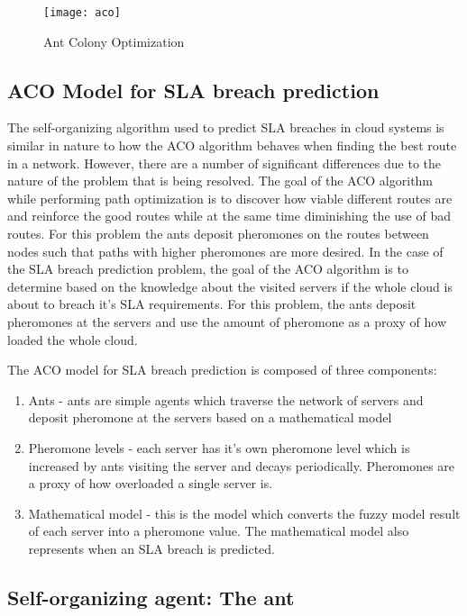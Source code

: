 \begin{figure}
	\centering
	\texttt{[image: aco]}
	\caption{Ant Colony Optimization}
	\label{fig:aco}
\end{figure}

\subsection{ACO Model for SLA breach prediction}

The self-organizing algorithm used to predict SLA breaches in cloud systems is similar in nature to how the ACO algorithm behaves when finding the best route in a network. However, there are a number of significant differences due to the nature of the problem that is being resolved. The goal of the ACO algorithm while performing path optimization is to discover how viable different routes are and reinforce the good routes while at the same time diminishing the use of bad routes. For this problem the ants deposit pheromones on the routes between nodes such that paths with higher pheromones are more desired. In the case of the SLA breach prediction problem, the goal of the ACO algorithm is to determine based on the knowledge about the visited servers if the whole cloud is about to breach it's SLA requirements. For this problem, the ants deposit pheromones at the servers and use the amount of pheromone as a proxy of how loaded the whole cloud.

The ACO model for SLA breach prediction is composed of three components:

\begin{enumerate}
	\item Ants - ants are simple agents which traverse the network of servers and deposit pheromone at the servers based on a mathematical model
	\item Pheromone levels - each server has it's own pheromone level which is increased by ants visiting the server and decays periodically. Pheromones are a proxy of how overloaded a single server is.
	\item Mathematical model - this is the model which converts the fuzzy model result of each server into a pheromone value. The mathematical model also represents when an SLA breach is predicted.
\end{enumerate}

\subsection{Self-organizing agent: The ant}


